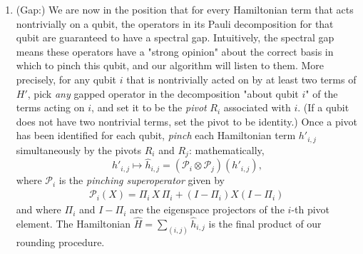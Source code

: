 \documentclass[a4paper,onecolumn,11pt]{quantumarticle}
\theoremstyle{plain}
\renewcommand{\cP}{\mathcal{P}}
\begin{document}
\begin{enumerate}
    \item (Gap:) We are now in the position that for every Hamiltonian term that acts nontrivially on a qubit, the operators in its Pauli decomposition for that qubit are guaranteed to have a spectral gap. Intuitively, the spectral gap means these operators have a "strong opinion" about the correct basis in which to pinch this qubit, and our algorithm will listen to them. More precisely, for any qubit $i$ that is nontrivially acted on by at least two terms of $H'$, pick \emph{any} gapped operator in the decomposition "about qubit $i$" of the terms acting on $i$, and set it to be the \emph{pivot} $R_i$ associated with $i$. (If a qubit does not have two nontrivial terms, set the pivot to be identity.) Once a pivot has been identified for each qubit, \emph{pinch} each Hamiltonian term $h'_{i,j}$ simultaneously by the pivots $R_i$ and $R_j$: mathematically,
    \[ h'_{i,j} \mapsto \hat{h}_{i,j} = (\cP_i \otimes \cP_j)(h'_{i,j}),\]
    where $\cP_i$ is the \emph{pinching superoperator} given by
 \begin{align}\label{eq:pinching-superoperator-overview}
    \mathcal{P}_i(X) = \Pi_i \, X \, \Pi_i + (I-\Pi_i) X (I-\Pi_i)\, 
    \end{align}
and where $\Pi_i$ and $I-\Pi_i$ are the eigenspace projectors of the $i$-th pivot element. The Hamiltonian $\hat{H} = \sum_{(i,j)} \hat{h}_{i,j}$ is the final product of our rounding procedure.


\end{enumerate}
\end{document}
